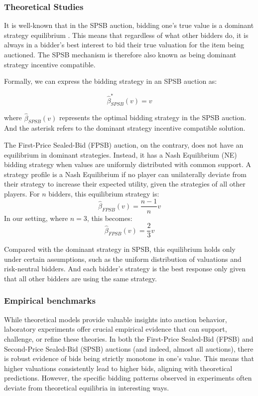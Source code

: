 \documentclass{article} %
\begin{document}
\subsubsection{Theoretical Studies}

It is well-known that in the SPSB auction, bidding one's true value is a dominant strategy equilibrium \cite{krishna2009auction}. 
This means that regardless of what other bidders do, it is always in a bidder's best interest to bid their true valuation for the item being auctioned. 
The SPSB mechanism is therefore also known as being dominant strategy incentive compatible.

Formally, we can express the bidding strategy in an SPSB auction as:

\begin{equation}
    \hat{\beta}^*_{SPSB}(v) = v
\end{equation}

where $\hat{\beta}_{SPSB}(v)$ represents the optimal bidding strategy in the SPSB auction. And the asterisk refers to the dominant strategy incentive compatible solution.


The First-Price Sealed-Bid (FPSB) auction, on the contrary, does not have an equilibrium in dominant strategies. 
Instead, it has a Nash Equilibrium (NE) bidding strategy when values are uniformly distributed with common support. 
A strategy profile is a Nash Equilibrium if no player can unilaterally deviate from their strategy to increase their expected utility, given the strategies of all other players.
For $n$ bidders, this equilibrium strategy is:
\begin{equation}
\hat{\beta}_{FPSB}(v) =  \frac{n-1}{n} v
\end{equation}
In our setting, where $n=3$, this becomes:
\begin{equation}
\hat{\beta}_{FPSB}(v) = \frac{2}{3}v
\end{equation}

Compared with the dominant strategy in SPSB, this equilibrium holds only under certain assumptions, such as the uniform distribution of valuations and risk-neutral bidders.
And each bidder's strategy is the best response only given that all other bidders are using the same strategy.



\subsubsection{Empirical benchmarks}
While theoretical models provide valuable insights into auction behavior, laboratory experiments offer crucial empirical evidence that can support, challenge, or refine these theories.  
In both the First-Price Sealed-Bid (FPSB) and Second-Price Sealed-Bid (SPSB) auctions (and indeed, almost all auctions), there is robust evidence of bids being strictly monotone in one's value. 
This means that higher valuations consistently lead to higher bids, aligning with theoretical predictions. 
However, the specific bidding patterns observed in experiments often deviate from theoretical equilibria in interesting ways.
\end{document}
